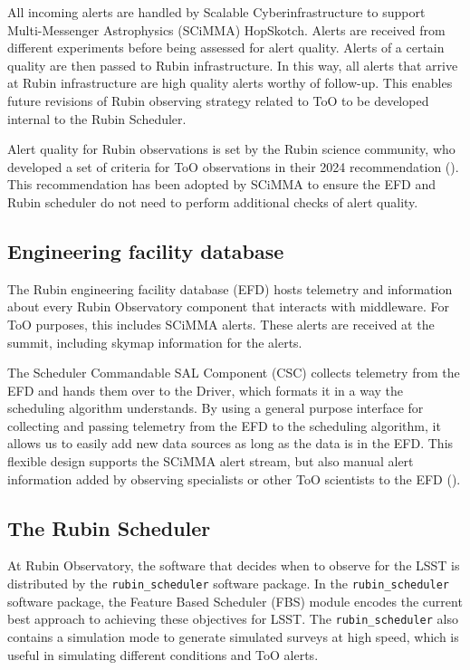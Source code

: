 All incoming alerts are handled by Scalable Cyberinfrastructure to support Multi-Messenger Astrophysics (SCiMMA) HopSkotch. Alerts are received from different experiments before being assessed for alert quality. Alerts of a certain quality are then passed to Rubin infrastructure. In this way, all alerts that arrive at Rubin infrastructure are high quality alerts worthy of follow-up. This enables future revisions of Rubin observing strategy related to ToO to be developed internal to the Rubin Scheduler.

Alert quality for Rubin observations is set by the Rubin science community, who developed a set of criteria for ToO observations in their 2024 recommendation (\cite{RubinToO2024}). This recommendation has been adopted by SCiMMA to ensure the EFD and Rubin scheduler do not need to perform additional checks of alert quality.

\subsection{Engineering facility database}\label{subsec:EFD}

The Rubin engineering facility database (EFD) hosts telemetry and information about every Rubin Observatory component that interacts with middleware. For ToO purposes, this includes SCiMMA alerts. These alerts are received at the summit, including skymap information for the alerts. 

The Scheduler Commandable SAL Component (CSC) collects telemetry from the EFD and hands them over to the Driver, which formats it in a way the scheduling algorithm understands. By using a general purpose interface for collecting and passing telemetry from the EFD to the scheduling algorithm, it allows us to easily add new data sources as long as the data is in the EFD. This flexible design supports the SCiMMA alert stream, but also manual alert information added by observing specialists or other ToO scientists to the EFD (\cite{TSTN-035}). 

\subsection{The Rubin Scheduler}\label{subsec:Scheduler}

At Rubin Observatory, the software that decides when to observe for the LSST is distributed by the \verb|rubin_scheduler| software package. In the \verb|rubin_scheduler| software package, the Feature Based Scheduler (FBS) module encodes the current best approach to achieving these objectives for LSST. The \verb|rubin_scheduler| also contains a simulation mode to generate simulated surveys at high speed, which is useful in simulating different conditions and ToO alerts. 

